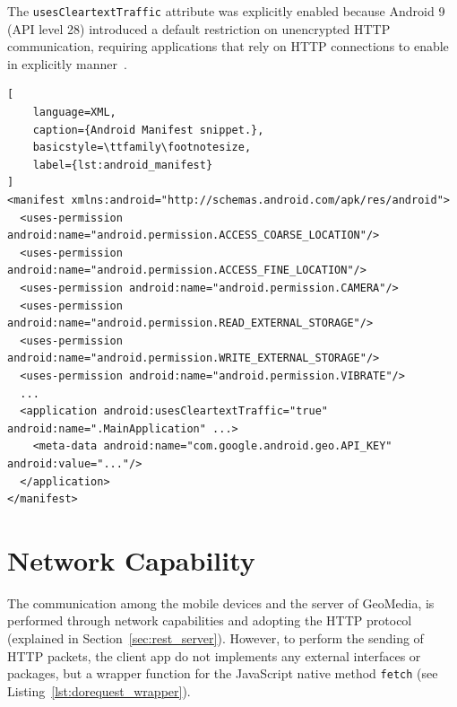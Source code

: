 The \texttt{usesCleartextTraffic} attribute was explicitly enabled because Android 9 (API level 28) introduced a default restriction on unencrypted HTTP communication, requiring applications that rely on HTTP connections to enable in explicitly manner~\cite{site:android-http-cleartext}.

\newpage

\begin{lstlisting}[
    language=XML,
    caption={Android Manifest snippet.},
    basicstyle=\ttfamily\footnotesize,
    label={lst:android_manifest}
]
<manifest xmlns:android="http://schemas.android.com/apk/res/android">
  <uses-permission android:name="android.permission.ACCESS_COARSE_LOCATION"/>
  <uses-permission android:name="android.permission.ACCESS_FINE_LOCATION"/>
  <uses-permission android:name="android.permission.CAMERA"/>
  <uses-permission android:name="android.permission.READ_EXTERNAL_STORAGE"/>
  <uses-permission android:name="android.permission.WRITE_EXTERNAL_STORAGE"/>
  <uses-permission android:name="android.permission.VIBRATE"/>
  ...
  <application android:usesCleartextTraffic="true" android:name=".MainApplication" ...>
    <meta-data android:name="com.google.android.geo.API_KEY" android:value="..."/>
  </application>
</manifest>
\end{lstlisting}

\section{Network Capability}

The communication among the mobile devices and the server of GeoMedia, is performed through network capabilities and adopting the HTTP protocol (explained in Section~\ref{sec:rest_server}). However, to perform the sending of HTTP packets, the client app do not implements any external interfaces or packages, but a wrapper function for the JavaScript native method \texttt{fetch} (see Listing~\ref{lst:dorequest_wrapper}).


